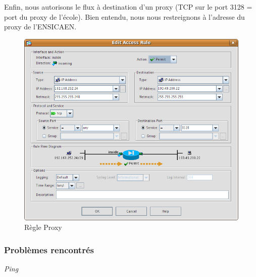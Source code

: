 \documentclass[a4paper,12pt]{article}
\begin{document}
\newpage
Enfin, nous autorisons le flux à destination d'un proxy (TCP sur le port 3128 = port du proxy de l'école). Bien entendu, nous nous restreignons à l'adresse du
proxy de l'ENSICAEN. 
\begin{figure}[H]
	\center
	\includegraphics[width=15cm]{img/8-policyinsidetcpproxy.png}
	\caption{Règle Proxy}
\end{figure}


\newpage
\subsubsection{Problèmes rencontrés}
\textit{Ping}
\end{document}
